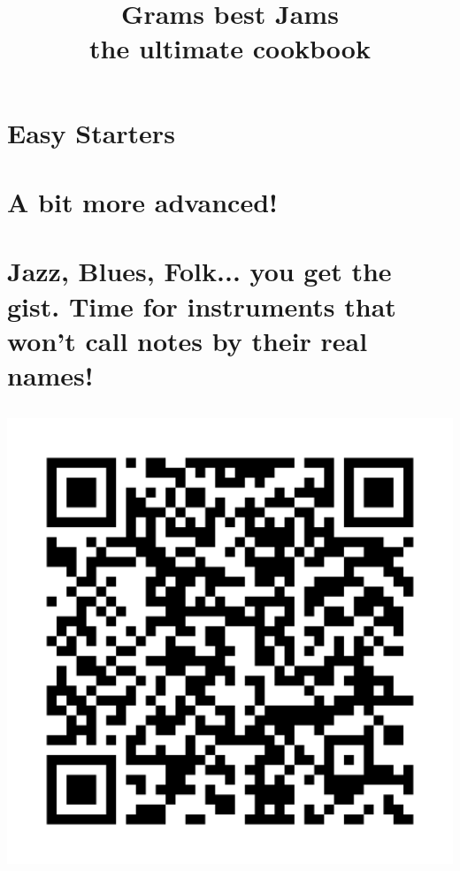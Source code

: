 \documentclass[openany]{book}
\title{Grams best Jams\\the ultimate cookbook}
\author{}
\date{}
\begin{document}
\maketitle
\frontmatter
\tableofcontents



\part{Easy Starters}






\part{A bit more advanced!}




\part{Jazz, Blues, Folk... you get the gist. Time for instruments that won't call notes by their real names!}






%

\chapter[]{}
\includegraphics[width=1\linewidth]{QR_Codes/QR_SpotifyPlaylist.png}

\
\end{document}
